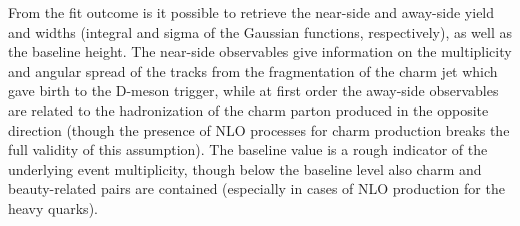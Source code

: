 From the fit outcome is it possible to retrieve the near-side and away-side yield and widths (integral and sigma of the Gaussian functions, respectively), as well as the baseline height. The near-side observables give information on the multiplicity and angular spread of the tracks from the fragmentation of the charm jet which gave birth to the D-meson trigger, while at first order the away-side observables are related to the hadronization of the charm parton produced in the opposite direction (though the presence of NLO processes for charm production breaks the full validity of this assumption). The baseline value is a rough indicator of the underlying event multiplicity, though below the baseline level also charm and beauty-related pairs are contained (especially in cases of NLO production for the heavy quarks).

